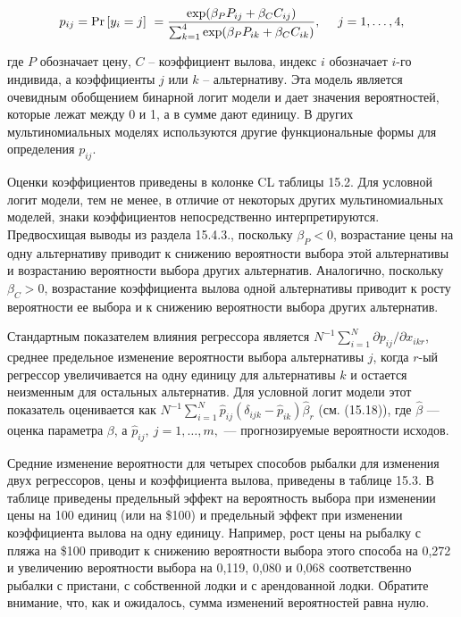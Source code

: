 \[p_{ij}={\Pr  \left[y_i=j\right]\ }=
\frac{{\rm exp} ({\beta }_PP_{ij}+{\beta }_CC_{ij})}{\sum^4_{k=1}{{\rm exp} ({\beta }_PP_{ik}+{\beta }_CC_{ik})}},\ \ \ \ j=1,\dots ,4,\] 

где $P$ обозначает цену, $C$ -- коэффициент вылова, индекс $i$ обозначает $i$-го индивида, а коэффициенты $j$ или $k$ -- альтернативу. Эта модель является очевидным обобщением бинарной логит модели и дает значения вероятностей, которые лежат между 0 и 1, а в сумме дают единицу. В других мультиномиальных моделях используются другие функциональные формы для определения $p_{ij}$.

Оценки коэффициентов приведены в колонке CL таблицы 15.2. Для условной логит модели, тем не менее, в отличие от некоторых других мультиномиальных моделей, знаки коэффициентов непосредственно интерпретируются. Предвосхищая выводы из раздела 15.4.3., поскольку ${\beta }_P< 0$,  возрастание цены на одну альтернативу приводит к снижению вероятности выбора этой альтернативы и возрастанию вероятности выбора других альтернатив. Аналогично, поскольку ${\beta }_C>0$, возрастание коэффициента вылова одной альтернативы приводит к росту вероятности ее выбора и к снижению вероятности выбора других альтернатив.



Стандартным показателем влияния регрессора является $N^{-1}\sum^N_{i=1}{{\partial p_{ij}}/{\partial x_{ikr}}}$, среднее предельное изменение вероятности выбора альтернативы $j$, когда $r$-ый регрессор увеличивается на одну единицу для альтернативы $k$ и остается неизменным для остальных альтернатив. Для условной логит модели этот показатель оценивается как $N^{-1}\sum^N_{i=1}{{\hat{p}}_{ij}\left({\delta }_{ijk}-{\hat{p}}_{ik}\right){\widehat{\beta }}_r}$ (см. (15.18)), где $\widehat{\beta }$ --- оценка параметра $\beta $, а ${\hat{p}}_{ij},\ j=1,\dots ,m,$ --- прогнозируемые вероятности исходов.

Средние изменение вероятности для четырех способов рыбалки для изменения двух регрессоров, цены и коэффициента вылова, приведены в таблице 15.3. В таблице приведены предельный эффект на вероятность выбора при изменении цены на 100 единиц (или на \$100) и предельный эффект при изменении  коэффициента вылова на одну единицу. Например, рост цены на рыбалку с пляжа на \$100 приводит к снижению вероятности выбора этого способа на 0,272 и увеличению вероятности выбора на 0,119, 0,080 и 0,068 соответственно рыбалки с пристани, с собственной лодки и с арендованной лодки. Обратите внимание, что, как и ожидалось, сумма изменений вероятностей равна нулю.

